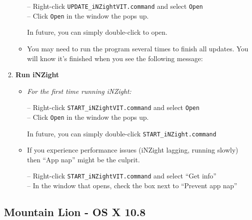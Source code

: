 \documentclass[10pt,a4paper,twoside]{article}
\begin{document}
\begin{enumerate}
\begin{itemize}
    -- Right-click \verb+UPDATE_iNZightVIT.command+ and select \verb+Open+\\
    -- Click \verb+Open+ in the window the pops up.
    
    In future, you can simply double-click to open.

  \item You may need to run the program several times to finish all updates. You will know
    it's finished when you see the following message:
  \end{itemize}

\item \textbf{Run iNZight}

  \begin{itemize}
  \item \emph{For the first time running iNZight:}

    -- Right-click \verb+START_iNZightVIT.command+ and select \verb+Open+\\
    -- Click \verb+Open+ in the window the pops up.

    In future, you can simply double-click \verb+START_iNZight.command+

  \item If you experience performance issues (iNZight lagging, running slowly) then ``App
    nap'' might be the culprit.
    
    -- Right-click \verb+START_iNZightVIT.command+ and select ``Get info''\\
    -- In the window that opens, check the box next to ``Prevent app nap''
  \end{itemize}

\end{enumerate}




\vfill\pagebreak
\subsection{Mountain Lion - OS X 10.8}
\end{document}
